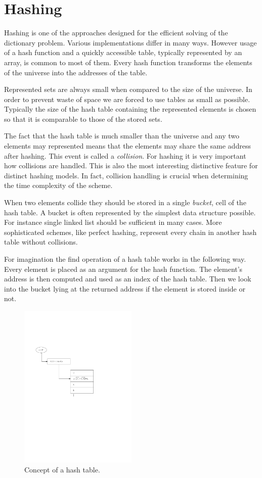 \chapter{Hashing}
\label{chapter-hashing}
Hashing is one of the approaches designed for the efficient solving of the dictionary problem. Various implementations differ in many ways. However usage of a hash function and a quickly accessible table, typically represented by an array, is common to most of them. Every hash function transforms the elements of the universe into the addresses of the table.

Represented sets are always small when compared to the size of the universe. In order to prevent waste of space we are forced to use tables as small as possible. Typically the size of the hash table containing the represented elements is chosen so that it is comparable to those of the stored sets. 

The fact that the hash table is much smaller than the universe and any two elements may represented means that the elements may share the same address after hashing. This event is called a \emph{collision}. For hashing it is very important how collisions are handled. This is also the most interesting distinctive feature for distinct hashing models. In fact, collision handling is crucial when determining the time complexity of the scheme.

When two elements collide they should be stored in a single \emph{bucket}, cell of the hash table. A bucket is often represented by the simplest data structure possible. For instance single linked list should be sufficient in many cases. More sophisticated schemes, like perfect hashing, represent every chain in another hash table without collisions.

For imagination the find operation of a hash table works in the following way. Every element is placed as an argument for the hash function. The element's address is then computed and used as an index of the hash table. Then we look into the bucket lying at the returned address if the element is stored inside or not.

\begin{figure}
  \centering
    \includegraphics[width=0.5\textwidth]{images/hash_table}
  \caption{Concept of a hash table.}
\end{figure}

